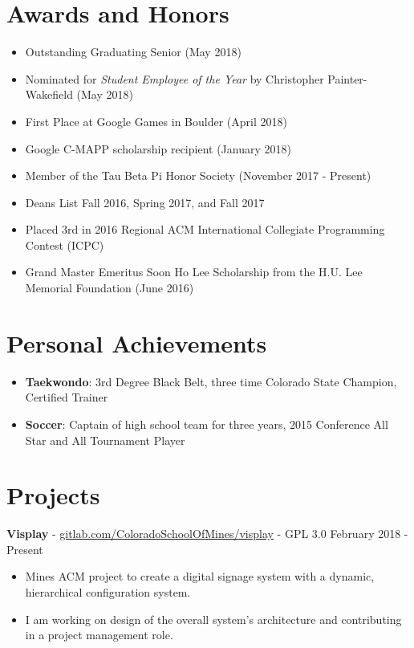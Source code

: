 \documentclass[10pt,letterpaper]{article}
\begin{document}
\section*{Awards and Honors}
\begin{itemize}
    \item Outstanding Graduating Senior (May 2018)
    \item Nominated for \textit{Student Employee of the Year} by Christopher
        Painter-Wakefield (May 2018)
    \item First Place at Google Games in Boulder (April 2018)
    \item Google C-MAPP scholarship recipient (January 2018)
    \item Member of the Tau Beta Pi Honor Society (November 2017 - Present)
    \item Deans List Fall 2016, Spring 2017, and Fall 2017
    \item Placed 3rd in 2016 Regional ACM International Collegiate Programming
        Contest (ICPC)
    \item Grand Master Emeritus Soon Ho Lee Scholarship from the H.U. Lee
        Memorial Foundation (June 2016)
\end{itemize}

\section*{Personal Achievements}
\begin{itemize}
    \item \textbf{Taekwondo}: 3rd Degree Black Belt, three time Colorado State
        Champion, Certified Trainer
    \item \textbf{Soccer}: Captain of high school team for three years, 2015
        Conference All Star and All Tournament Player
\end{itemize}

\section*{Projects}
\textbf{Visplay} -
\href{https://gitlab.com/ColoradoSchoolOfMines/visplay}{gitlab.com/ColoradoSchoolOfMines/visplay}
- GPL 3.0 \hfill February 2018 - Present
\begin{itemize}
    \item Mines ACM project to create a digital signage system with a dynamic,
        hierarchical configuration system.
    \item I am working on design of the overall system's architecture and
        contributing in a project management role.
\end{itemize}
\end{document}
